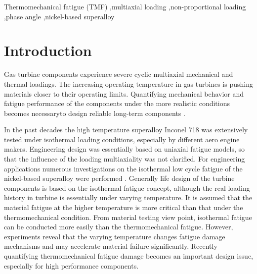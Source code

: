 \documentclass[preprint,5p,twocolumn,11pt,sort&compress]{elsarticle}
\begin{document}
\begin{frontmatter}
\begin{abstract}
\end{abstract}

%
\begin{keyword}
Thermomechanical fatigue (TMF) \sep multiaxial loading \sep non-proportional loading \sep phase angle \sep nickel-based superalloy

\end{keyword}
\end{frontmatter}

\section{Introduction}
Gas turbine components experience severe cyclic multiaxial mechanical and thermal loadings. The increasing operating temperature in gas turbines is pushing materials closer to their operating limits. Quantifying mechanical behavior and fatigue performance of the components under the more realistic conditions becomes necessaryto design reliable long-term components  \cite{Harrison1996}.

In the past decades the high temperature superalloy Inconel 718 was extensively tested under isothermal loading conditions, especially by different aero engine makers. Engineering design was essentially based on uniaxial fatigue models, so that the influence of the loading multiaxiality was not clarified.
 For engineering applications numerous investigations on the isothermal low cycle fatigue of the nickel-based superalloy were performed \cite{Koch85, Morrow88, Mahobia2014, Chen2016, William1995, kim1988elevated, nelson1992creep}. 
Generally life design of the turbine components is based on the isothermal fatigue concept, although the real loading history in turbine is essentially under varying temperature. It is assumed that the material fatigue at the higher temperature is more critical than that under the thermomechanical condition. From material testing view point, isothermal fatigue can be conducted more easily than the thermomechanical fatigue. However, experiments reveal that the varying temperature changes fatigue damage mechanisms and may accelerate material failure significantly. Recently quantifying thermomechanical fatigue damage becomes an important design issue, especially for high performance components.
\end{document}
